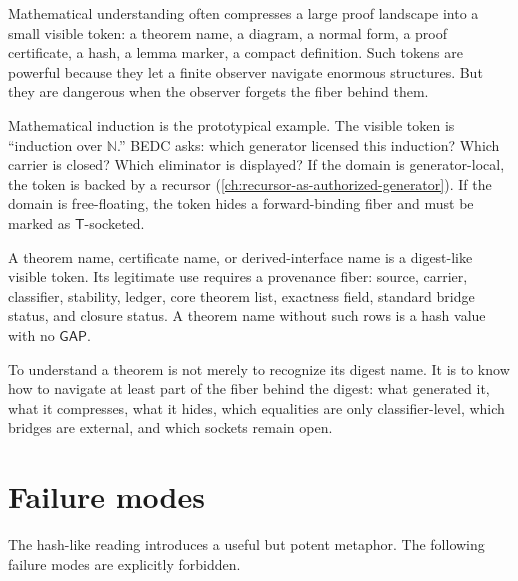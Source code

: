 Mathematical understanding often compresses a large proof landscape into a small visible token: a theorem name, a diagram, a normal form, a proof certificate, a hash, a lemma marker, a compact definition. Such tokens are powerful because they let a finite observer navigate enormous structures. But they are dangerous when the observer forgets the fiber behind them.

Mathematical induction is the prototypical example. The visible token is ``induction over $\mathbb{N}$.'' BEDC asks: which generator licensed this induction? Which carrier is closed? Which eliminator is displayed? If the domain is generator-local, the token is backed by a recursor (\autoref{ch:recursor-as-authorized-generator}). If the domain is free-floating, the token hides a forward-binding fiber and must be marked as $\mathsf{T}$-socketed.

\begin{principle}
\label{prin:hash-like-theorem-names-digest-like}
A theorem name, certificate name, or derived-interface name is a digest-like visible token. Its legitimate use requires a provenance fiber: source, carrier, classifier, stability, ledger, core theorem list, exactness field, standard bridge status, and closure status. A theorem name without such rows is a hash value with no $\mathsf{GAP}$.
\end{principle}

\begin{remark}
\label{rem:hash-like-understanding-as-fiber}
To understand a theorem is not merely to recognize its digest name. It is to know how to navigate at least part of the fiber behind the digest: what generated it, what it compresses, what it hides, which equalities are only classifier-level, which bridges are external, and which sockets remain open.
\end{remark}

\section{Failure modes}
\label{sec:hash-like-failure-modes}

The hash-like reading introduces a useful but potent metaphor. The following failure modes are explicitly forbidden.

